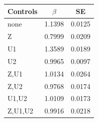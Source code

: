 \begin{tabular}{lcc}
\hline
Controls & $\beta$ & SE \\
\hline
none & 1.1398 & 0.0125 \\
Z & 0.7999 & 0.0209 \\
U1 & 1.3589 & 0.0189 \\
U2 & 0.9965 & 0.0097 \\
Z,U1 & 1.0134 & 0.0264 \\
Z,U2 & 0.9768 & 0.0174 \\
U1,U2 & 1.0109 & 0.0173 \\
Z,U1,U2 & 0.9916 & 0.0218 \\
\hline
\end{tabular}
